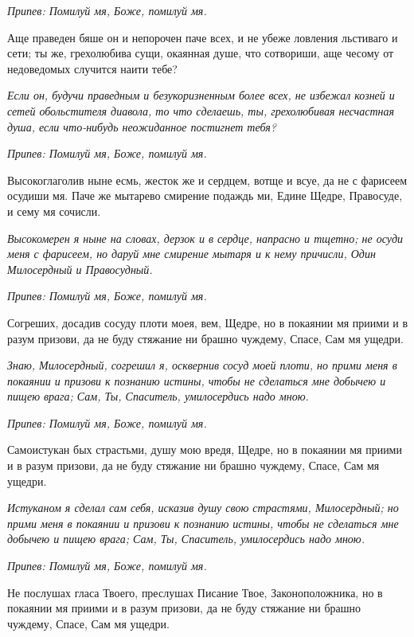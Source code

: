 \itshape Припев:\normalfont{} Помилуй мя, Боже, помилуй мя.


Аще праведен бяше он и непорочен паче всех, и не убеже ловления льстиваго и сети; ты же, грехолюбива сущи, окаянная душе, что сотвориши, аще чесому от недоведомых случится наити тебе?


\itshape Если он, будучи праведным и безукоризненным более всех, не избежал козней и сетей обольстителя диавола, то что сделаешь, ты, грехолюбивая несчастная душа, если что-нибудь неожиданное постигнет тебя?\normalfont{}


\itshape Припев:\normalfont{} Помилуй мя, Боже, помилуй мя.


Высокоглаголив ныне есмь, жесток же и сердцем, вотще и всуе, да не с фарисеем осудиши мя. Паче же мытарево смирение подаждь ми, Едине Щедре, Правосуде, и сему мя сочисли.


\itshape Высокомерен я ныне на словах, дерзок и в сердце, напрасно и тщетно; не осуди меня с фарисеем, но даруй мне смирение мытаря и к нему причисли, Один Милосердный и Правосудный.\normalfont{}


\itshape Припев:\normalfont{} Помилуй мя, Боже, помилуй мя.


Согреших, досадив сосуду плоти моея, вем, Щедре, но в покаянии мя приими и в разум призови, да не буду стяжание ни брашно чуждему, Спасе, Сам мя ущедри.


\itshape Знаю, Милосердный, согрешил я, осквернив сосуд моей плоти, но прими меня в покаянии и призови к познанию истины, чтобы не сделаться мне добычею и пищею врага; Сам, Ты, Спаситель, умилосердись надо мною.\normalfont{}


\itshape Припев:\normalfont{} Помилуй мя, Боже, помилуй мя.


Самоистукан бых страстьми, душу мою вредя, Щедре, но в покаянии мя приими и в разум призови, да не буду стяжание ни брашно чуждему, Спасе, Сам мя ущедри.


\itshape Истуканом я сделал сам себя, исказив душу свою страстями, Милосердный; но прими меня в покаянии и призови к познанию истины, чтобы не сделаться мне добычею и пищею врага; Сам, Ты, Спаситель, умилосердись надо мною.\normalfont{}


\itshape Припев:\normalfont{} Помилуй мя, Боже, помилуй мя.


Не послушах гласа Твоего, преслушах Писание Твое, Законоположника, но в покаянии мя приими и в разум призови, да не буду стяжание ни брашно чуждему, Спасе, Сам мя ущедри.


